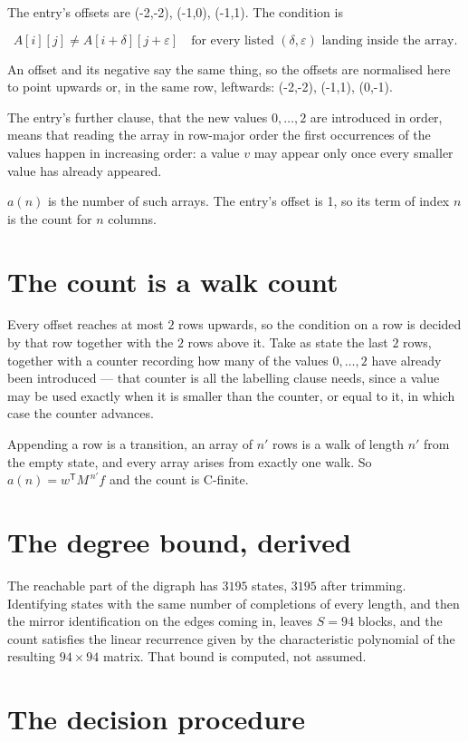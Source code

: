 \documentclass[11pt]{article}
\theoremstyle{definition}
\begin{document}
The entry's offsets are (-2,-2), (-1,0), (-1,1). The condition is

\[A[i][j] \ne A[i{+}\delta][j{+}\varepsilon]\quad\text{for every listed }(\delta,\varepsilon)\text{ landing inside the array.}\]

An offset and its negative say the same thing, so the offsets are normalised here to point upwards or, in the same row, leftwards: (-2,-2), (-1,1), (0,-1).

The entry's further clause, that the new values $0,\dots,2$ are introduced in order, means that reading the array in row-major order the first occurrences of the values happen in increasing order: a value $v$ may appear only once every smaller value has already appeared.

$a(n)$ is the number of such arrays. The entry's offset is 1, so its term of index $n$ is the count for $n$ columns.

\section{The count is a walk count}

Every offset reaches at most $2$ rows upwards, so the condition on a row is decided by that row together with the $2$ rows above it. Take as state the last $2$ rows, together with a counter recording how many of the values $0,\dots,2$ have already been introduced --- that counter is all the labelling clause needs, since a value may be used exactly when it is smaller than the counter, or equal to it, in which case the counter advances.

Appending a row is a transition, an array of $n'$ rows is a walk of length $n'$ from the empty state, and every array arises from exactly one walk. So $a(n) = w^{\mathsf T}M^{\,n'}f$ and the count is C-finite.

\section{The degree bound, derived}

The reachable part of the digraph has $3195$ states, $3195$ after trimming. Identifying states with the same number of completions of every length, and then the mirror identification on the edges coming in, leaves $S = 94$ blocks, and the count satisfies the linear recurrence given by the characteristic polynomial of the resulting $94\times94$ matrix. That bound is computed, not assumed.

\section{The decision procedure}
\end{document}
